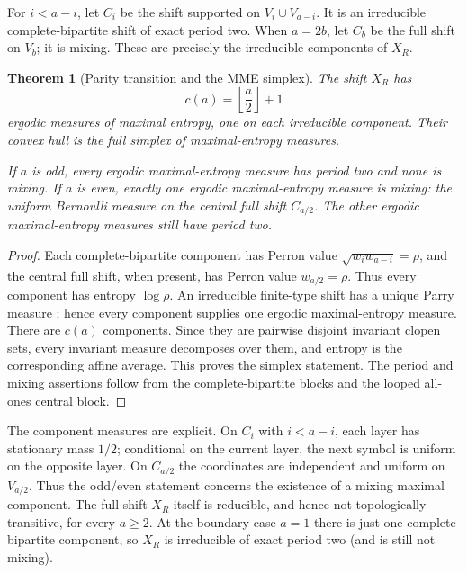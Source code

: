 \documentclass[11pt,a4paper]{amsart}
\newtheorem{theorem}{Theorem}[section]
\theoremstyle{definition}
\theoremstyle{remark}
\begin{document}
For $i<a-i$, let $C_i$ be the shift supported on
$V_i\cup V_{a-i}$.  It is an irreducible complete-bipartite shift of exact
period two.  When $a=2b$, let $C_b$ be the full shift on $V_b$; it is mixing.
These are precisely the irreducible components of $X_R$.

\begin{theorem}[Parity transition and the MME simplex]
\label{thm:mme}
The shift $X_R$ has
\begin{equation}\label{eq:mme-count}
 c(a)=\left\lfloor\frac a2\right\rfloor+1
\end{equation}
ergodic measures of maximal entropy, one on each irreducible component.
Their convex hull is the full simplex of maximal-entropy measures.

If $a$ is odd, every ergodic maximal-entropy measure has period two and none
is mixing.  If $a$ is even, exactly one ergodic maximal-entropy measure is
mixing: the uniform Bernoulli measure on the central full shift $C_{a/2}$.
The other ergodic maximal-entropy measures still have period two.
\end{theorem}

\begin{proof}
Each complete-bipartite component has Perron value
$\sqrt{w_iw_{a-i}}=\rho$, and the central full shift, when present, has
Perron value $w_{a/2}=\rho$.  Thus every component has entropy
$\log\rho$.  An irreducible finite-type shift has a unique Parry measure
\cite{Parry1964}; hence every component supplies one ergodic
maximal-entropy measure.  There are $c(a)$ components.  Since they are
pairwise disjoint invariant clopen sets, every invariant measure decomposes
over them, and entropy is the corresponding affine average.  This proves
the simplex statement.  The period and mixing assertions follow from the
complete-bipartite blocks and the looped all-ones central block.
\end{proof}

The component measures are explicit.  On $C_i$ with $i<a-i$, each layer has
stationary mass $1/2$; conditional on the current layer, the next symbol is
uniform on the opposite layer.  On $C_{a/2}$ the coordinates are independent
and uniform on $V_{a/2}$.  Thus the odd/even statement concerns the existence
of a mixing maximal component.  The full shift $X_R$ itself is reducible, and
hence not topologically transitive, for every $a\geq2$.  At the boundary case
$a=1$ there is just one complete-bipartite component, so $X_R$ is irreducible
of exact period two (and is still not mixing).
\end{document}
